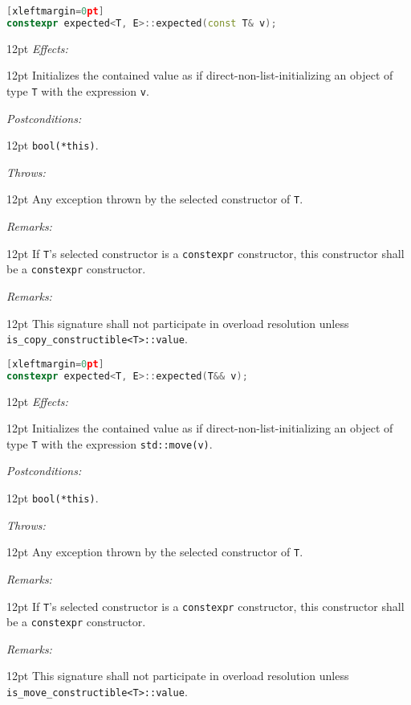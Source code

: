 \documentclass[a4paper,10pt]{article}
\newcommand{\cpp}[1]{\lstinline{#1}}
\newcommand{\wordingItem}[1]{\noindent\textit{#1:}}
\newenvironment{wordingTextItem}[1]{\wordingItem{#1}\vspace{2pt}\noindent\begin{adjustwidth}{12pt}{}}{\vspace{2pt}\end{adjustwidth}}
\newenvironment{wordingPara}{\begin{adjustwidth}{12pt}{}}{\end{adjustwidth}}
\begin{document}
\begin{lstlisting}[language=C++][xleftmargin=0pt]
constexpr expected<T, E>::expected(const T& v);
\end{lstlisting}
\begin{wordingPara}
\begin{wordingTextItem}{Effects}
Initializes the contained value as if direct-non-list-initializing an object of type \cpp{T} with the expression \cpp{v}.
\end{wordingTextItem}
\begin{wordingTextItem}{Postconditions}
\cpp{bool(*this)}.
\end{wordingTextItem}
\begin{wordingTextItem}{Throws}
Any exception thrown by the selected constructor of \cpp{T}.
\end{wordingTextItem}
\begin{wordingTextItem}{Remarks}
If \cpp{T}'s selected constructor is a \cpp{constexpr} constructor, this constructor shall be a \cpp{constexpr} constructor.
\end{wordingTextItem}
\begin{wordingTextItem}{Remarks}
This signature shall not participate in overload resolution unless\\
\cpp{is_copy_constructible<T>::value}. 
\end{wordingTextItem}
\end{wordingPara}

\begin{lstlisting}[language=C++][xleftmargin=0pt]
constexpr expected<T, E>::expected(T&& v); 
\end{lstlisting}
\begin{wordingPara}
\begin{wordingTextItem}{Effects}
Initializes the contained value as if direct-non-list-initializing an object of type \cpp{T} with the expression \cpp{std::move(v)}.
\end{wordingTextItem}
\begin{wordingTextItem}{Postconditions}
\cpp{bool(*this)}.
\end{wordingTextItem}
\begin{wordingTextItem}{Throws}
Any exception thrown by the selected constructor of \cpp{T}.
\end{wordingTextItem}
\begin{wordingTextItem}{Remarks}
If \cpp{T}'s selected constructor is a \cpp{constexpr} constructor, this constructor shall be a \cpp{constexpr} constructor.
\end{wordingTextItem}
\begin{wordingTextItem}{Remarks}
This signature shall not participate in overload resolution unless\\
\cpp{is_move_constructible<T>::value}.
\end{wordingTextItem}
\end{wordingPara}
\end{document}
